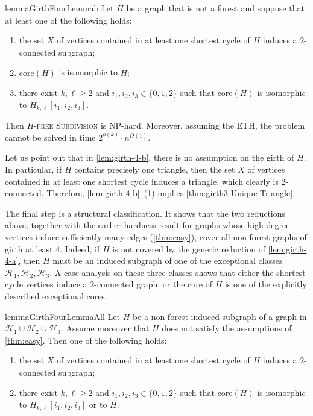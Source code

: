 \documentclass[a4paper,UKenglish,cleveref, autoref, thm-restate]{lipics-v2021}
\newcommand{\core}{\mathrm{core}}
\begin{document}
\begin{restatable}{lemma}{GirthFourLemmab}
\label{lem:girth-4-b}
Let $H$ be a graph that is not a forest and suppose that at least one of the following holds:
\begin{enumerate}[(1)]
    \item the set $X$ of vertices contained in at least one shortest cycle of $H$ induces a $2$-connected subgraph;
    \item $\core(H)$ is isomorphic to $\widetilde{H}$;
    \item there exist $k,\ell\geq 2$ and $i_1,i_2,i_3\in \{0,1,2\}$ such that
    $\core(H)$ is isomorphic to $H_{k,\ell}[i_1,i_2,i_3]$.
\end{enumerate}
Then \textsc{$H$-free Subdivision} is NP-hard.
Moreover, assuming the ETH, the problem cannot be solved in time
$2^{o(k)}\cdot n^{O(1)}$.
\end{restatable}

Let us point out that in \cref{lem:girth-4-b}, there is no assumption on the girth of $H$.
In particular, if $H$ contains precisely one triangle, then the set $X$ of vertices contained in at least one shortest cycle induces a triangle, which clearly is 2-connected.
Therefore, \cref{lem:girth-4-b}~(1) implies \cref{thm:girth3-Unique-Triangle}.

\GirthUniqueTriangle*

The final step is a structural classification.
It shows that the two reductions above, together with the earlier hardness result for graphs whose high-degree vertices induce sufficiently many edges (\cref{thm:easy}), cover all non-forest graphs of girth at least $4$.
Indeed, if $H$ is not covered by the generic reduction of \cref{lem:girth-4-a}, then $H$ must be an induced subgraph of one of the exceptional classes
$\mathcal H_1,\mathcal H_2,\mathcal H_3$.
A case analysis on these three classes shows that either the shortest-cycle vertices induce a $2$-connected graph, or the core of $H$ is one of the explicitly described exceptional cores.

\begin{restatable}{lemma}{GirthFourLemmaAll}
\label{lem:girth-4-all}
Let $H$ be a non-forest induced subgraph of a graph in
$\mathcal H_1\cup \mathcal H_2\cup \mathcal H_3$.
Assume moreover that $H$ does not satisfy the assumptions of \cref{thm:easy}.
Then one of the following holds:
\begin{enumerate}[(1)]
    \item the set $X$ of vertices contained in at least one shortest cycle of $H$ induces a $2$-connected subgraph;\label{it:cycles}
    \item there exist $k,\ell\geq 2$ and $i_1,i_2,i_3\in\{0,1,2\}$ such that
    $\core(H)$ is isomorphic to $H_{k,\ell}[i_1,i_2,i_3]$ or to $\widetilde{H}$.\label{it:special}
\end{enumerate}
\end{restatable}
\end{document}
